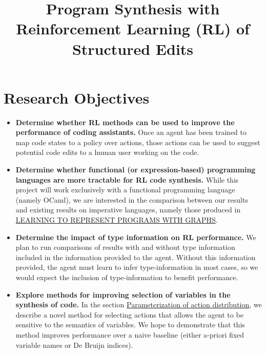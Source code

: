 \documentclass{article}
\title{Program Synthesis with Reinforcement Learning (RL) of Structured Edits}
\author{
}
\begin{document}
\maketitle

\section{Research Objectives}
\begin{itemize}
    \item \textbf{Determine whether RL methods can be used to improve the performance of coding assistants.} Once an agent has been trained to map code states to a policy over actions, those actions can be used to suggest potential code edits to a human user working on the code.
    \item \textbf{Determine whether functional (or expression-based) programming languages are more tractable for RL code synthesis.} While this project will work exclusively with a functional programming language (namely OCaml), we are interested in the comparison between our results and existing results on imperative languages, namely those produced in \href{https://arxiv.org/abs/1711.00740}{LEARNING TO REPRESENT PROGRAMS WITH GRAPHS}.
    \item \textbf{Determine the impact of type information on RL performance.} We plan to run comparisons of results with and without type information included in the information provided to the agent. Without this information provided, the agent must learn to infer type-information in most cases, so we would expect the inclusion of type-information to benefit performance.
    \item \textbf{Explore methods for improving selection of variables in the synthesis of code.} In the section \hyperref[sec:parameterization]{Parameterization of action distribution}, we describe a novel method for selecting actions that allows the agent to be sensitive to the semantics of variables. We hope to demonstrate that this method improves performance over a naive baseline (either a-priori fixed variable names or De Bruijn indices).

\end{itemize}
\end{document}
